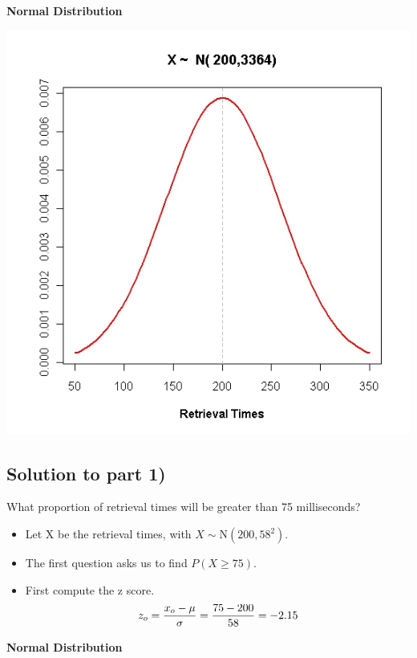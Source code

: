 ﻿\documentclass[]{report}
\begin{document}
	\textbf{Normal Distribution}
	
	\begin{center}
		\includegraphics[scale=0.40]{images/5BNormal1}
	\end{center}



	\subsection{Solution to part 1)}
	What proportion of retrieval times will be greater than 75 milliseconds?\\ \bigskip
	
	\begin{itemize}
		\item Let X be the retrieval times, with $X \sim \mbox{N}(200,58^2)$.\\
		\item The first question asks us to find $P( X \geq 75)$. \\
		\item First compute the z score.
		\[ z_o =  {x_o - \mu \over \sigma} = {75 - 200 \over 58}  = -2.15 \]
	\end{itemize}

	
	\textbf{Normal Distribution}
	
\end{document}
